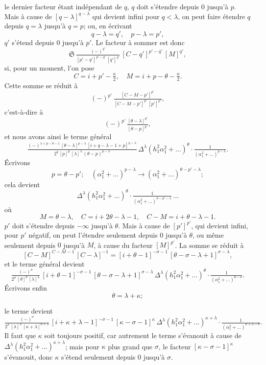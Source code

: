 \documentclass[12pt,a4paper]{article}
\providecommand{\fS}{\mathfrak{S}}
\begin{document}
le dernier facteur \'etant ind\'ependant de $q$, $q$ doit s'\'etendre depuis $0$ jusqu'\`a $p$. Mais \`a cause de $[q - \lambda]^{q - \lambda}$ qui devient infini pour $q < \lambda$, on peut faire \'etendre $q$ depuis $q = \lambda$ jusqu'\`a $q = p$; ou, en \'ecrivant
\[
q - \lambda = q',\quad p - \lambda = p',
\]
$q'$ s'\'etend depuis $0$ jusqu'\`a $p'$. Le facteur \`a sommer est donc
\[
\fS\,\tfrac{(-)^{q'}}{[p' - q']^{p' - q'}\,[q']^{q'}}\,[C - q']^{p' - q'}\,[M]^{q'},
\]
si, pour un moment, l'on pose
\[
C = i + p' - \tfrac{n}{2},\quad M = i + p - \theta - \tfrac{n}{2}.
\]
Cette somme se r\'eduit \`a
\[
(-)^{p'}\,\tfrac{[C - M - p']^{p'}}{[C - M - p']^{p'}\, [p']^{p'}},
\]
c'est-\`a-dire \`a
\[
(-)^{p'}\,\tfrac{[\theta - \lambda]^{p'}}{[\theta - p]^{p'}},
\]
et nous avons ainsi le terme g\'en\'eral
\[
\tfrac{(-)^{\lambda + p - \theta - 1}\,[\theta - \lambda]^{p - \lambda}\,[i + q - \lambda - 1 + p]^{q - \lambda}}{2^q\,[p]^p\,[\lambda]^{\lambda}\,(\theta - p)^{p - \lambda}}\,\Delta^{\lambda}(h_1^2\alpha_1^2 + \ldots)^{\theta} \cdot \tfrac{1}{(\alpha_1^2 + \ldots)^{p - \lambda}}.
\]
\'Ecrivons
\[
p = \theta - p';\quad (\alpha_1^2 + \ldots)^{p - \lambda} \to (\alpha_1^2 + \ldots)^{\theta - p' - \lambda};
\]
cela devient
\[
\Delta^{\lambda}(h_1^2\alpha_1^2 + \ldots)^{\theta} \cdot \tfrac{1}{(\alpha_1^2 + \ldots)^{\theta - p' - \lambda}}\,\ldots
\]
o\`u
\[
M = \theta - \lambda,\quad C = i + 2\theta - \lambda - 1,\quad C - M = i + \theta - \lambda - 1.
\]
$p'$ doit s'\'etendre depuis $-\infty$ jusqu'\`a $\theta$. Mais \`a cause de $[p']^{p'}$, qui devient infini, pour $p'$ n\'egatif, on peut l'\'etendre seulement depuis $0$ jusqu'\`a $\theta$, ou m\^eme seulement depuis $0$ jusqu'\`a $M$, \`a cause du facteur $[M]^{p'}$. La somme se r\'eduit \`a
\[
[C - M]^{C - M - 1}\,[C - \lambda]^{-1} = [i + \theta - 1]^{-\sigma - 1}\,[\theta - \sigma - \lambda + 1]^{\sigma - \lambda},
\]
et le terme g\'en\'eral devient
\[
\tfrac{(-)^{\sigma}}{2^{\sigma}\,[\theta]^{\theta}\,[\lambda]^{\lambda}}\,[i + \theta - 1]^{-\sigma - 1}\,[\theta - \sigma - \lambda + 1]^{\sigma - \lambda}\,\Delta^{\lambda}(h_1^2\alpha_1^2 + \ldots)^{\theta} \cdot \tfrac{1}{(\alpha_1^2 + \ldots)^{\theta - \sigma}}.
\]
\'Ecrivons enfin
\[
\theta = \lambda + \kappa;
\]

\newpage
\setcounter{page}{202}

le terme devient
\[
\tfrac{(-)^{\sigma}}{2^{\sigma}\,[\lambda]^{\lambda}\,[\kappa + \lambda]^{\kappa + \lambda}}\,[i + \kappa + \lambda - 1]^{-\sigma - 1}\,[\kappa - \sigma - 1]^{\kappa}\,\Delta^{\lambda}(h_1^2\alpha_1^2 + \ldots)^{\kappa + \lambda} \cdot \tfrac{1}{(\alpha_1^2 + \ldots)^{\kappa + \lambda - \sigma}}.
\]
Il faut que $\kappa$ soit toujours positif, car autrement le terme s'\'evanouit \`a cause de $\Delta^{\lambda}(h_1^2\alpha_1^2 + \ldots)^{\kappa + \lambda}$; mais pour $\kappa$ plus grand que $\sigma$, le facteur $[\kappa - \sigma - 1]^{\kappa}$ s'\'evanouit, donc $\kappa$ s'\'etend seulement depuis $0$ jusqu'\`a $\sigma$.
\end{document}
